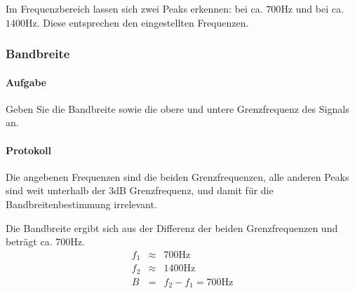 \documentclass[10pt]{report}
\begin{document}
        Im Frequenzbereich lassen sich zwei Peaks erkennen: bei ca. $700\si{\hertz}$
        und bei ca. $1400\si{\hertz}$. Diese entsprechen den eingestellten
        Frequenzen.

        \subsubsection{Bandbreite}
        \paragraph{Aufgabe}
        Geben Sie die Bandbreite sowie die obere und untere Grenzfrequenz des Signals an.
        \paragraph{Protokoll}
        Die angebenen Frequenzen sind die beiden Grenzfrequenzen, alle anderen
        Peaks sind weit unterhalb der $3$dB Grenzfrequenz, und damit für die
        Bandbreitenbestimmung irrelevant.

        Die Bandbreite ergibt sich aus der Differenz der beiden Grenzfrequenzen
        und beträgt ca. $700\si{\hertz}$.
        \begin{eqnarray*}
            f_1 &\approx& 700\si{\hertz}\\
            f_2 &\approx& 1400\si{\hertz}\\
            B &=& f_2 - f_1 = 700\si{\hertz}
        \end{eqnarray*}
\end{document}
